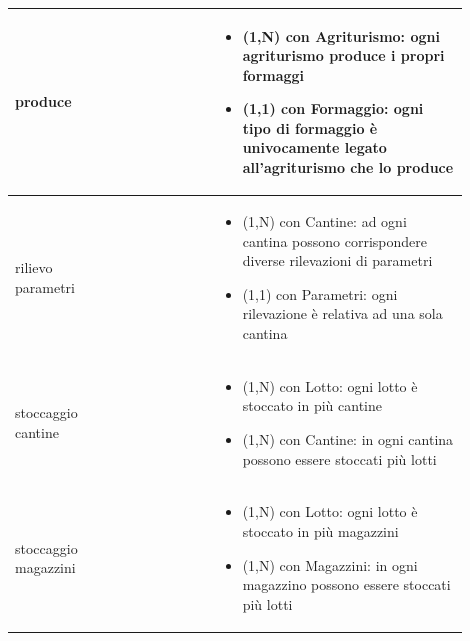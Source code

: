 \documentclass[12pt,a4paper]{article}
\begin{document}
\begin{center}
\begin{longtable}{|p{0.16\linewidth}|p{0.24\linewidth}|p{0.50\linewidth}|}
\hline
produce 				& \begin{flushleft}\vspace{-15pt}  \end{flushleft}
					& \begin{itemize}
						\setlength{\itemindent}{-1em}
						\vspace{-25pt}
						\setlength\itemsep{-0.25em}
						\item (1,N) con Agriturismo: ogni agriturismo produce i propri formaggi
						\item (1,1) con Formaggio: ogni tipo di formaggio è univocamente legato all'agriturismo che lo produce
					\end{itemize}\\ 

\hline
rilievo parametri 				& \begin{flushleft}\vspace{-15pt}  \end{flushleft}
					& \begin{itemize}
						\setlength{\itemindent}{-1em}
						\vspace{-25pt}
						\setlength\itemsep{-0.25em}
						\item (1,N) con Cantine: ad ogni cantina possono corrispondere diverse rilevazioni di parametri
						\item (1,1) con Parametri: ogni rilevazione è relativa ad una sola cantina
					\end{itemize}\\ 

\hline
stoccaggio cantine 				& \begin{flushleft}\vspace{-15pt}  \end{flushleft}
					& \begin{itemize}
						\setlength{\itemindent}{-1em}
						\vspace{-25pt}
						\setlength\itemsep{-0.25em}
						\item (1,N) con Lotto: ogni lotto è stoccato in più cantine
						\item (1,N) con Cantine: in ogni cantina possono essere stoccati più lotti
					\end{itemize}\\ 

\hline
stoccaggio magazzini 				& \begin{flushleft}\vspace{-15pt}  \end{flushleft}
					& \begin{itemize}
						\setlength{\itemindent}{-1em}
						\vspace{-25pt}
						\setlength\itemsep{-0.25em}
						\item (1,N) con Lotto: ogni lotto è stoccato in più magazzini
						\item (1,N) con Magazzini: in ogni magazzino possono essere stoccati più lotti
					\end{itemize}\\ 


\end{longtable}
\end{center}
\end{document}
